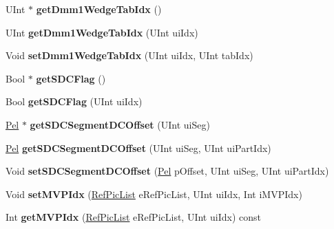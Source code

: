 \begin{DoxyCompactItemize}
U\+Int $\ast$ {\bfseries get\+Dmm1\+Wedge\+Tab\+Idx} ()
\item 
\mbox{\label{class_t_com_data_c_u_a56e4ca490b53b6e11b4ee0507a03f579}} 
U\+Int {\bfseries get\+Dmm1\+Wedge\+Tab\+Idx} (U\+Int ui\+Idx)
\item 
\mbox{\label{class_t_com_data_c_u_ae6095913d07df4f603b599d91b3359ac}} 
Void {\bfseries set\+Dmm1\+Wedge\+Tab\+Idx} (U\+Int ui\+Idx, U\+Int tab\+Idx)
\item 
\mbox{\label{class_t_com_data_c_u_a0801de7a486224d572d1b5510c19a8be}} 
Bool $\ast$ {\bfseries get\+S\+D\+C\+Flag} ()
\item 
\mbox{\label{class_t_com_data_c_u_a0d00860d85b6017be6b1216ba7609bd6}} 
Bool {\bfseries get\+S\+D\+C\+Flag} (U\+Int ui\+Idx)
\item 
\mbox{\label{class_t_com_data_c_u_ad6ec84054ba38fa7e13a556fdfe32dcf}} 
\hyperlink{_type_def_8h_af92141699657699b4b547be0c8517541}{Pel} $\ast$ {\bfseries get\+S\+D\+C\+Segment\+D\+C\+Offset} (U\+Int ui\+Seg)
\item 
\mbox{\label{class_t_com_data_c_u_a9a05a00cef134074b87992963e957a58}} 
\hyperlink{_type_def_8h_af92141699657699b4b547be0c8517541}{Pel} {\bfseries get\+S\+D\+C\+Segment\+D\+C\+Offset} (U\+Int ui\+Seg, U\+Int ui\+Part\+Idx)
\item 
\mbox{\label{class_t_com_data_c_u_a204e58c528f593dc1a8bd9f2fef392b0}} 
Void {\bfseries set\+S\+D\+C\+Segment\+D\+C\+Offset} (\hyperlink{_type_def_8h_af92141699657699b4b547be0c8517541}{Pel} p\+Offset, U\+Int ui\+Seg, U\+Int ui\+Part\+Idx)
\item 
\mbox{\label{class_t_com_data_c_u_afbe5a8de446b737865001f6c4dd23001}} 
Void {\bfseries set\+M\+V\+P\+Idx} (\hyperlink{_type_def_8h_a93cea48eb9dcfd661168dee82e41b384}{Ref\+Pic\+List} e\+Ref\+Pic\+List, U\+Int ui\+Idx, Int i\+M\+V\+P\+Idx)
\item 
\mbox{\label{class_t_com_data_c_u_a4d21f5f0acff14afb53f2f926ed7764f}} 
Int {\bfseries get\+M\+V\+P\+Idx} (\hyperlink{_type_def_8h_a93cea48eb9dcfd661168dee82e41b384}{Ref\+Pic\+List} e\+Ref\+Pic\+List, U\+Int ui\+Idx) const

\end{DoxyCompactItemize}
